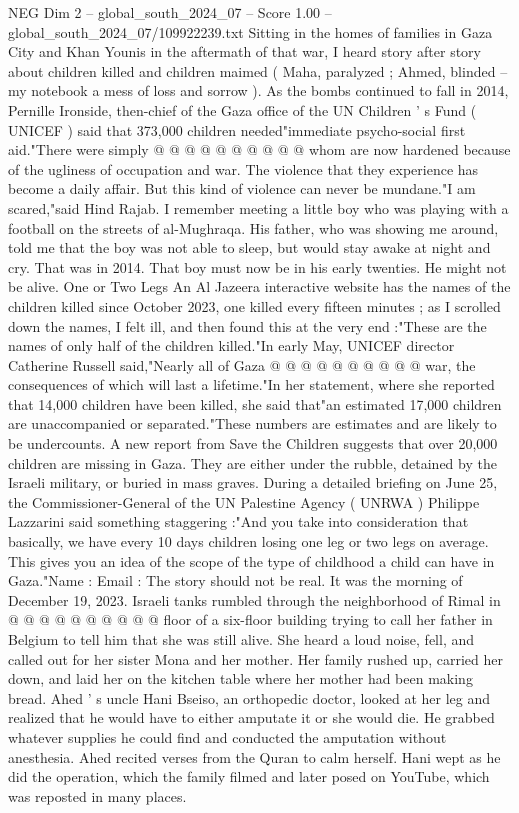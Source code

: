 \begin{textsample}{NEG Dim 2 – global\_south\_2024\_07 – Score 1.00 – global\_south\_2024\_07/109922239.txt}
Sitting in the homes of families in Gaza City and Khan Younis in the aftermath of that war, I heard story after story about children killed and children maimed ( Maha, paralyzed ; Ahmed, blinded -- my notebook a mess of loss and sorrow ).
As the bombs continued to fall in 2014, Pernille Ironside, then-chief of the Gaza office of the UN Children ' s Fund ( UNICEF ) said that 373,000 children needed"immediate psycho-social first aid."There were simply @ @ @ @ @ @ @ @ @ @ whom are now hardened because of the ugliness of occupation and war.
The violence that they experience has become a daily affair.
But this kind of violence can never be mundane."I am scared,"said Hind Rajab.
I remember meeting a little boy who was playing with a football on the streets of al-Mughraqa.
His father, who was showing me around, told me that the boy was not able to sleep, but would stay awake at night and cry.
That was in 2014.
That boy must now be in his early twenties.
He might not be alive.
One or Two Legs An Al Jazeera interactive website has the names of the children killed since October 2023, one killed every fifteen minutes ; as I scrolled down the names, I felt ill, and then found this at the very end :"These are the names of only half of the children killed."In early May, UNICEF director Catherine Russell said,"Nearly all of Gaza @ @ @ @ @ @ @ @ @ @ war, the consequences of which will last a lifetime."In her statement, where she reported that 14,000 children have been killed, she said that"an estimated 17,000 children are unaccompanied or separated."These numbers are estimates and are likely to be undercounts.
A new report from Save the Children suggests that over 20,000 children are missing in Gaza.
They are either under the rubble, detained by the Israeli military, or buried in mass graves.
During a detailed briefing on June 25, the Commissioner-General of the UN Palestine Agency ( UNRWA ) Philippe Lazzarini said something staggering :"And you take into consideration that basically, we have every 10 days children losing one leg or two legs on average.
This gives you an idea of the scope of the type of childhood a child can have in Gaza."Name : Email : The story should not be real.
It was the morning of December 19, 2023.
Israeli tanks rumbled through the neighborhood of Rimal in @ @ @ @ @ @ @ @ @ @ floor of a six-floor building trying to call her father in Belgium to tell him that she was still alive.
She heard a loud noise, fell, and called out for her sister Mona and her mother.
Her family rushed up, carried her down, and laid her on the kitchen table where her mother had been making bread.
Ahed ' s uncle Hani Bseiso, an orthopedic doctor, looked at her leg and realized that he would have to either amputate it or she would die.
He grabbed whatever supplies he could find and conducted the amputation without anesthesia.
Ahed recited verses from the Quran to calm herself.
Hani wept as he did the operation, which the family filmed and later posed on YouTube, which was reposted in many places.

\end{textsample}
